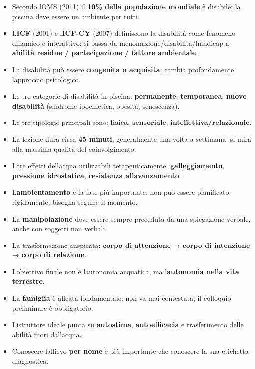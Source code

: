 \documentclass[a4paper,11pt]{article}
\providecommand{\tightlist}{%
  \setlength{\itemsep}{0pt}\setlength{\parskip}{0pt}}
\begin{document}
\begin{itemize}
      \tightlist
      \item
            Secondo l\textquotesingle OMS (2011) il \textbf{10\% della popolazione
                  mondiale} è disabile; la piscina deve essere un ambiente per tutti.
      \item
            L\textquotesingle{}\textbf{ICF} (2001) e
            l\textquotesingle{}\textbf{ICF-CY} (2007) definiscono la disabilità
            come fenomeno dinamico e interattivo: si passa da
            menomazione/disabilità/handicap a \textbf{abilità residue /
                  partecipazione / fattore ambientale}.
      \item
            La disabilità può essere \textbf{congenita o acquisita}: cambia
            profondamente l\textquotesingle approccio psicologico.
      \item
            Le tre categorie di disabilità in piscina: \textbf{permanente},
            \textbf{temporanea}, \textbf{nuove disabilità} (sindrome ipocinetica,
            obesità, senescenza).
      \item
            Le tre tipologie principali sono: \textbf{fisica},
            \textbf{sensoriale}, \textbf{intellettiva/relazionale}.
      \item
            La lezione dura circa \textbf{45 minuti}, generalmente una volta a
            settimana; si mira alla massima qualità del coinvolgimento.
      \item
            I tre effetti dell\textquotesingle acqua utilizzabili
            terapeuticamente: \textbf{galleggiamento}, \textbf{pressione
                  idrostatica}, \textbf{resistenza all\textquotesingle avanzamento}.
      \item
            L\textquotesingle{}\textbf{ambientamento} è la fase più importante:
            non può essere pianificato rigidamente; bisogna seguire il momento.
      \item
            La \textbf{manipolazione} deve essere sempre preceduta da una
            spiegazione verbale, anche con soggetti non verbali.
      \item
            La trasformazione auspicata: \textbf{corpo di attenzione} →
            \textbf{corpo di intenzione} → \textbf{corpo di relazione}.
      \item
            L\textquotesingle obiettivo finale non è l\textquotesingle autonomia
            acquatica, ma l\textquotesingle{}\textbf{autonomia nella vita
                  terrestre}.
      \item
            La \textbf{famiglia} è alleata fondamentale: non va mai contestata; il
            colloquio preliminare è obbligatorio.
      \item
            L\textquotesingle istruttore ideale punta su \textbf{autostima},
            \textbf{autoefficacia} e trasferimento delle abilità fuori
            dall\textquotesingle acqua.
      \item
            Conoscere l\textquotesingle allievo \textbf{per nome} è più importante
            che conoscere la sua etichetta diagnostica.
\end{itemize}
\end{document}
